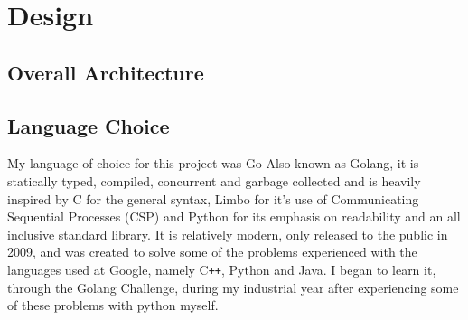 \chapter{Design}




 


\section{Overall Architecture}

\section{Language Choice}
My language of choice for this project was Go\cite{GOLANG}
Also known as Golang, it is statically typed, compiled, concurrent and  garbage collected and is heavily inspired by C for the general syntax, Limbo for it's use of Communicating Sequential Processes (CSP)\cite{HOARE-CSP} and Python for its emphasis on readability and an all inclusive standard library.
It is relatively modern, only released to the public in 2009, and was created to solve some of the problems experienced with the languages used at Google, namely C\verb!++!, Python and Java.
I began to learn it, through the Golang Challenge\cite{GOLANG-CHALLENGE},  during my industrial year after experiencing some of these problems with python myself.

